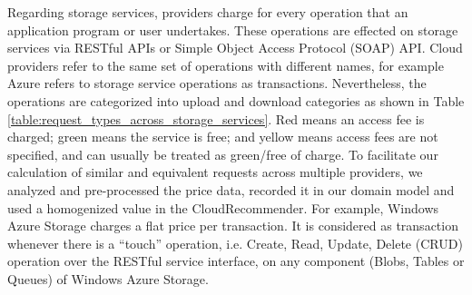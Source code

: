 Regarding storage services, providers charge for every operation that an application
program or user undertakes. These operations are effected on storage services via
RESTful APIs or Simple Object Access Protocol (SOAP) API. Cloud providers refer to
the same set of operations with different names, for example Azure refers to storage
service operations as transactions. Nevertheless, the operations are categorized into
upload and download categories as shown in Table \ref{table:request_types_across_storage_services}.
Red means an access fee is charged;
green means the service is free; and yellow means access fees are not specified,
and can usually be treated as green/free of charge. To facilitate our calculation of similar
and equivalent requests across multiple providers, we analyzed and pre-processed the
price data, recorded it in our domain model and used a homogenized value in the CloudRecommender. For example, Windows Azure Storage
charges a flat price per transaction. It is considered as transaction whenever there is a
“touch” operation, i.e. Create, Read, Update, Delete (CRUD) operation over the RESTful
service interface, on any component (Blobs, Tables or Queues) of Windows Azure Storage.

